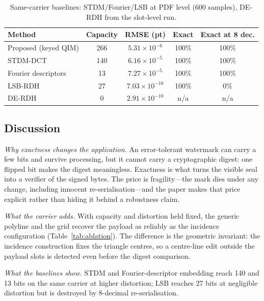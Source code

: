 \documentclass[journal]{IEEEtran}
\begin{document}
\begin{table}[t]
\centering
\footnotesize
\caption{Same-carrier baselines: STDM/Fourier/LSB at PDF level (600 samples), DE-RDH from the slot-level run.}
\label{tab:baselines}
\begin{tabular}{@{}lcccc@{}}
\toprule
Method & Capacity & RMSE (pt) & Exact & Exact at 8 dec. \\
\midrule
Proposed (keyed QIM) & 266 & $5.31\times10^{-6}$ & 100\% & 100\% \\
STDM-DCT & 140 & $6.16\times10^{-5}$ & 100\% & 100\% \\
Fourier descriptors & 13 & $7.27\times10^{-5}$ & 100\% & 100\% \\
LSB-RDH & 27 & $7.03\times10^{-10}$ & 100\% & 0\% \\
DE-RDH & 0 & $2.91\times10^{-10}$ & n/a & n/a \\
\bottomrule
\end{tabular}
\end{table}

\subsection{Discussion}
\emph{Why exactness changes the application.} An error-tolerant watermark can carry a few bits and survive processing, but it cannot carry a cryptographic digest: one flipped bit makes the digest meaningless. Exactness is what turns the visible seal into a verifier of the signed bytes. The price is fragility---the mark dies under any change, including innocent re-serialisation---and the paper makes that price explicit rather than hiding it behind a robustness claim.

\emph{What the carrier adds.} With capacity and distortion held fixed, the generic polyline and the grid recover the payload as reliably as the incidence configuration (Table~\ref{tab:ablation}). The difference is the geometric invariant: the incidence construction fixes the triangle centres, so a centre-line edit outside the payload slots is detected even before the digest comparison.

\emph{What the baselines show.} STDM and Fourier-descriptor embedding reach 140 and 13 bits on the same carrier at higher distortion; LSB reaches 27 bits at negligible distortion but is destroyed by 8-decimal re-serialisation.
\end{document}
